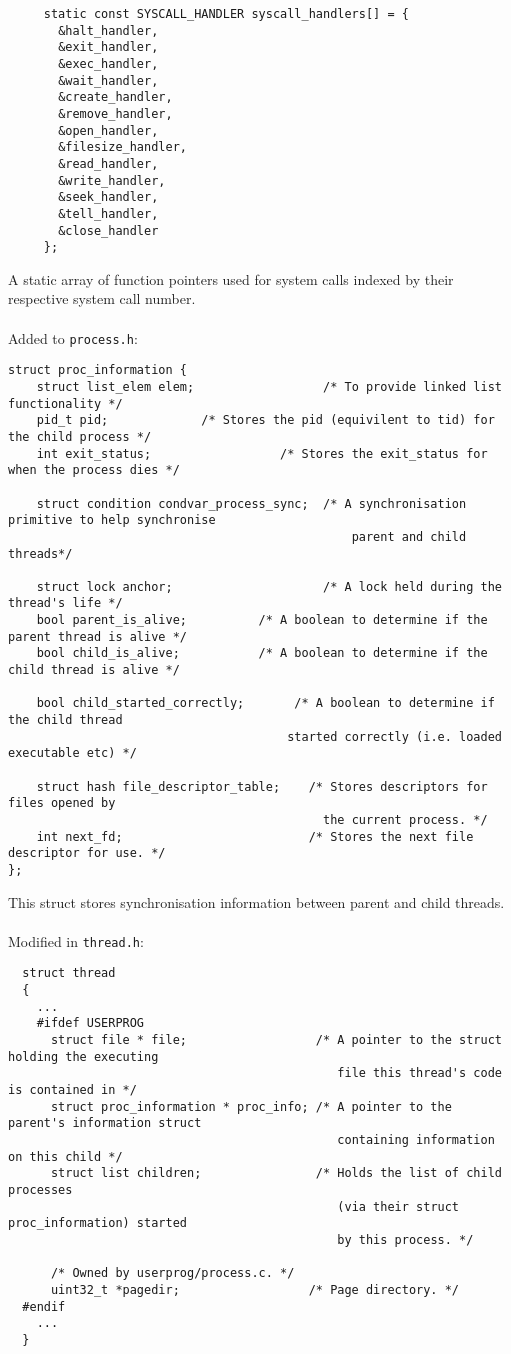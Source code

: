 \documentclass[a4wide, 11pt]{article}
\newcommand{\tx}{\texttt}
\begin{document}
\begin{verbatim}
     static const SYSCALL_HANDLER syscall_handlers[] = {
       &halt_handler,
       &exit_handler,
       &exec_handler,
       &wait_handler,
       &create_handler,
       &remove_handler,
       &open_handler,
       &filesize_handler,
       &read_handler,
       &write_handler,
       &seek_handler,
       &tell_handler,
       &close_handler
     };
\end{verbatim}
A static array of function pointers used for system calls indexed by their respective system call number.
\\\\
Added to \tx{process.h}:
\begin{verbatim}
struct proc_information { 
    struct list_elem elem;                  /* To provide linked list functionality */
    pid_t pid;             /* Stores the pid (equivilent to tid) for the child process */
    int exit_status;                  /* Stores the exit_status for when the process dies */
    
    struct condition condvar_process_sync;  /* A synchronisation primitive to help synchronise 
                                                parent and child threads*/
                                                
    struct lock anchor;                     /* A lock held during the thread's life */
    bool parent_is_alive;          /* A boolean to determine if the parent thread is alive */
    bool child_is_alive;           /* A boolean to determine if the child thread is alive */
    
    bool child_started_correctly;       /* A boolean to determine if the child thread 
                                       started correctly (i.e. loaded executable etc) */
    
    struct hash file_descriptor_table;    /* Stores descriptors for files opened by 
                                            the current process. */ 
    int next_fd;                          /* Stores the next file descriptor for use. */
};
\end{verbatim}
This struct stores synchronisation information between parent and child threads.
\\\\
Modified in \tx{thread.h}:
\begin{verbatim}
  struct thread
  {
    ...
    #ifdef USERPROG
      struct file * file;                  /* A pointer to the struct holding the executing 
                                              file this thread's code is contained in */
      struct proc_information * proc_info; /* A pointer to the parent's information struct
                                              containing information on this child */
      struct list children;                /* Holds the list of child processes 
                                              (via their struct proc_information) started
                                              by this process. */
                                              
      /* Owned by userprog/process.c. */
      uint32_t *pagedir;                  /* Page directory. */
  #endif
    ...
  }
\end{verbatim}
\end{document}
